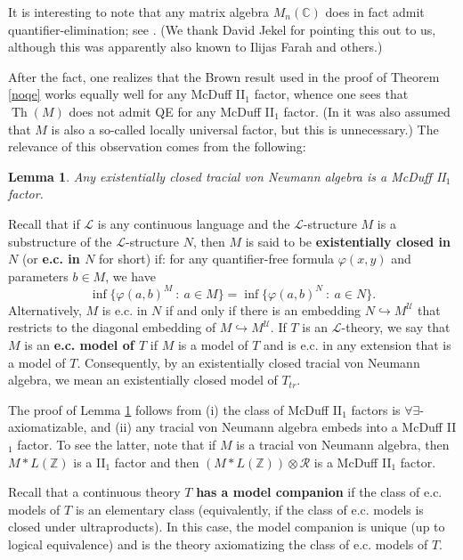 \documentclass[12pt]{amsart}
\newtheorem{lem}[thm]{Lemma}
\theoremstyle{definition}
\def\bb{\mathbb}
\def\bb{\mathbb}
\def\cal{\mathcal}
\def\u{\mathsf 1}
\newcommand\cL{{\cal L}}
\def \Th{\operatorname{Th}}
\def \R{\mathcal R}
\def \u{\mathcal U}
\begin{document}
It is interesting to note that any matrix algebra $M_n(\bb C)$ does in fact admit quantifier-elimination; see \cite[Theorem 2.2]{jing}.  (We thank David Jekel for pointing this out to us, although this was apparently also known to Ilijas Farah and others.)

After the fact, one realizes that the Brown result used in the proof of Theorem \ref{noqe} works equally well for any McDuff II$_1$ factor, whence one sees that $\Th(M)$ does not admit QE for any McDuff II$_1$ factor.  (In \cite{GHS} it was also assumed that $M$ is also a so-called locally universal factor, but this is unnecessary.)  The relevance of this observation comes from the following:

\begin{lem}\label{ecvnamcduff}
Any existentially closed tracial von Neumann algebra is a McDuff II$_1$ factor.
\end{lem}

Recall that if $\cL$ is any continuous language and the $\cL$-structure $M$ is a substructure of the $\cL$-structure $N$, then $M$ is said to be \textbf{existentially closed in $N$} (or \textbf{e.c. in $N$} for short) if:  for any quantifier-free formula $\varphi(x,y)$ and parameters $b\in M$, we have
$$\inf\{\varphi(a,b)^M \ : \ a\in M\}=\inf\{\varphi(a,b)^N \ : \ a\in N\}.$$ Alternatively, $M$ is e.c. in $N$ if and only if there is an embedding $N\hookrightarrow M^\u$ that restricts to the diagonal embedding of $M\hookrightarrow M^\u$.  If $T$ is an $\cL$-theory, we say that $M$ is an \textbf{e.c. model of $T$} if $M$ is a model of $T$ and is e.c. in any extension that is a model of $T$.  Consequently, by an existentially closed tracial von Neumann algebra, we mean an existentially closed model of $T_{tr}$.

The proof of Lemma \ref{ecvnamcduff} follows from (i) the class of McDuff II$_1$ factors is $\forall\exists$-axiomatizable, and (ii) any tracial von Neumann algebra embeds into a McDuff II$_1$ factor.  To see the latter, note that if $M$ is a tracial von Neumann algebra, then $M*L(\bb Z)$ is a II$_1$ factor and then $(M*L(\bb Z))\otimes \R$ is a McDuff II$_1$ factor.

Recall that a continuous theory $T$ \textbf{has a model companion} if the class of e.c. models of $T$ is an elementary class (equivalently, if the class of e.c. models is closed under ultraproducts).  In this case, the model companion is unique (up to logical equivalence) and is the theory axiomatizing the class of e.c. models of $T$.
\end{document}
